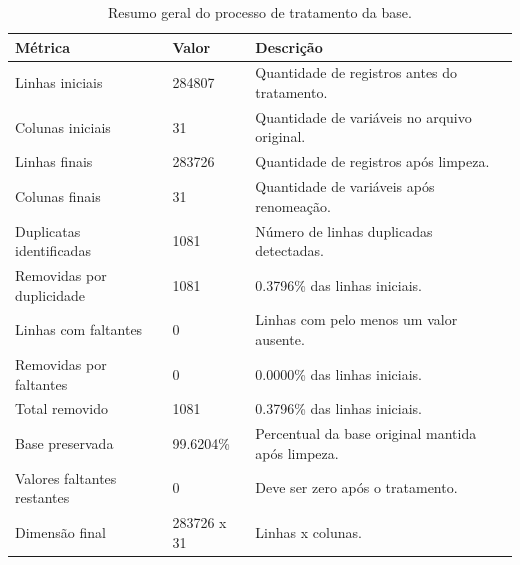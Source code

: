 \begin{table}
\caption{Resumo geral do processo de tratamento da base.}
\label{tab:resumo-etl}
\begin{tabular}{lll}
\toprule
Métrica & Valor & Descrição \\
\midrule
Linhas iniciais & 284807 & Quantidade de registros antes do tratamento. \\
Colunas iniciais & 31 & Quantidade de variáveis no arquivo original. \\
Linhas finais & 283726 & Quantidade de registros após limpeza. \\
Colunas finais & 31 & Quantidade de variáveis após renomeação. \\
Duplicatas identificadas & 1081 & Número de linhas duplicadas detectadas. \\
Removidas por duplicidade & 1081 & 0.3796\% das linhas iniciais. \\
Linhas com faltantes & 0 & Linhas com pelo menos um valor ausente. \\
Removidas por faltantes & 0 & 0.0000\% das linhas iniciais. \\
Total removido & 1081 & 0.3796\% das linhas iniciais. \\
Base preservada & 99.6204\% & Percentual da base original mantida após limpeza. \\
Valores faltantes restantes & 0 & Deve ser zero após o tratamento. \\
Dimensão final & 283726 x 31 & Linhas x colunas. \\
\bottomrule
\end{tabular}
\end{table}
